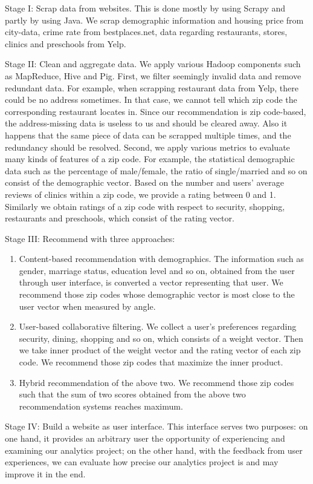 \documentclass[letterpaper,twocolumn,10pt]{article}
\begin{document}
Stage I: Scrap data from websites. This is done mostly by using Scrapy and partly by using Java.
We scrap  demographic information and  housing price from city-data, crime rate from bestplaces.net,  data regarding restaurants, stores, clinics and preschools from Yelp. 

Stage II: Clean  and aggregate data. We apply various Hadoop components such as MapReduce, Hive and Pig. First, we filter seemingly invalid data and remove redundant data. For example, when scrapping restaurant data from Yelp, there could be no address sometimes. In that case, we  cannot tell which zip code the corresponding restaurant locates in. Since our recommendation is zip code-based, the address-missing data is useless to us and should be cleared away. Also it happens that the same piece of data can be scrapped multiple times, and the redundancy  should be resolved. Second, we apply various metrics to evaluate many kinds of features of a zip code. For example,   the statistical demographic data such as the percentage of male/female, the ratio of single/married and so on consist of the demographic vector.
 Based on the number  and users' average reviews of clinics within a zip code, we provide a rating between 0 and 1. Similarly we obtain ratings of a zip code with respect to security, shopping, 
restaurants and preschools, which consist of the rating vector. 

Stage III: Recommend with three approaches: 
\begin{enumerate}
\item Content-based recommendation with demographics. The information  such as gender, marriage status, education level and so on,  obtained from the user through user interface, is converted a vector representing that user. We recommend those zip codes  whose demographic vector is most close to the user vector when measured by angle. 
\item User-based collaborative filtering. We collect a user's preferences regarding security, dining, shopping and so on, which consists of a weight vector. Then we  take inner product of the weight vector and the rating vector of each zip code. We recommend those zip codes that maximize the inner product. 
\item Hybrid recommendation of the above two. We recommend those zip codes such that the sum of two scores obtained from the above two recommendation systems reaches maximum.
\end{enumerate}

Stage IV: Build a website as user interface. This interface serves two purposes: on one hand, it   provides an  arbitrary user the opportunity of experiencing and examining our analytics project; on the other hand, with the feedback from user experiences, we can evaluate how precise our analytics project is and may improve it in the end.
\end{document}
